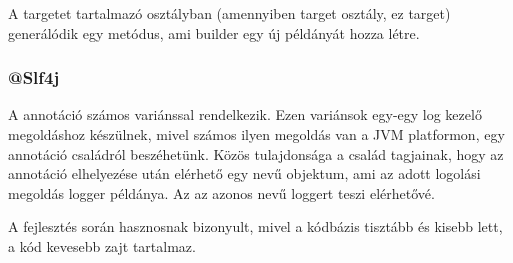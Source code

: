 A targetet tartalmazó osztályban (amennyiben target osztály, ez target)  generálódik egy  metódus, ami builder egy új példányát hozza létre. \par


\subsubsection{@Slf4j}

A  annotáció számos variánssal rendelkezik. Ezen variánsok egy-egy log kezelő megoldáshoz készülnek, mivel számos ilyen megoldás van a JVM platformon, egy annotáció családról beszéhetünk. Közös tulajdonsága a család tagjainak, hogy az annotáció elhelyezése után elérhető egy  nevű objektum, ami az adott logolási megoldás logger példánya. Az  az azonos nevű loggert teszi elérhetővé. \par

A fejlesztés során hasznosnak bizonyult, mivel a kódbázis tisztább és kisebb lett, a kód kevesebb zajt tartalmaz.




